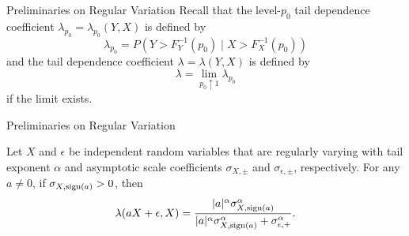 \documentclass{beamer}
\newtheorem{remark}{Remark}[section]
\def\P{\mathbb P}
\def\sign{{\rm sign}}
\begin{document}

    
        

\begin{frame}{Preliminaries on Regular Variation}
    Recall that the level-$p_0$ tail dependence coefficient $\lambda_{p_0} = \lambda_{p_0}(Y, X)$ is defined by
    \[
    \lambda_{p_0} = P(Y > F_Y^{-1}(p_0) \mid X > F_X^{-1}(p_0))
    \]
    and the tail dependence coefficient $\lambda = \lambda(Y, X)$ is defined by
    \[
    \lambda = \lim_{p_0 \uparrow 1} \lambda_{p_0}
    \]
    if the limit exists.
\end{frame}

\begin{frame}{Preliminaries on Regular Variation}
    \begin{lemma}\label{lem:lambda_lem}
        Let $X$ and $\epsilon$ be independent random variables that are regularly varying with tail exponent $\alpha$ and asymptotic scale coefficients $\sigma_{X, \pm}$ and $\sigma_{\epsilon, \pm}$, respectively. For any $a \ne 0$, if $\sigma_{X, \sign(a)} > 0$, then
        \[
        \lambda(a X + \epsilon, X) = \frac{|a|^\alpha \sigma_{X, \sign(a)}^\alpha}{|a|^\alpha \sigma_{X, \sign(a)}^\alpha + \sigma_{\epsilon, +}^\alpha}.
        \]
    \end{lemma}
\end{frame}
\end{document}
